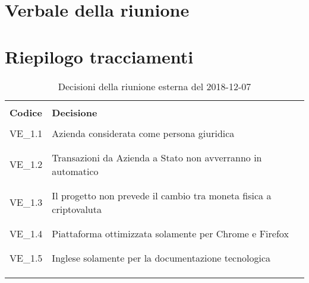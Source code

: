 \section{Verbale della riunione}

\begin{itemize}


\end{itemize}

\section{Riepilogo tracciamenti}
\begin{centering}
\begin{longtable}{ >{\centering}p{4cm} >{\centering}p{11cm} }

\hline
\\[0.5pt]
	\textbf{Codice} & \textbf{Decisione} 
	
	\tabularnewline 
	\hline
	
	
				\\[0.5pt]
				VE\_1.1 & Azienda considerata come persona giuridica
				\\[0.5pt]
				\tabularnewline
				\hline
						
				\\[0.5pt]
				VE\_1.2 & Transazioni da Azienda a Stato non avverranno in automatico
				\\[0.5pt]
				\tabularnewline
				\hline
				
				\\[0.5pt]
				VE\_1.3 & Il progetto non prevede il cambio tra moneta fisica a criptovaluta
				\\[0.5pt]
				\tabularnewline
				\hline
								
				\\[0.5pt]
				VE\_1.4 & Piattaforma ottimizzata solamente per Chrome e Firefox
				\\[0.5pt]
				\tabularnewline
				\hline
				
				\\[0.5pt]
				VE\_1.5 & Inglese solamente per la documentazione tecnologica
				\\[0.5pt]
				\tabularnewline
				\hline
				
                
        \\[0.7pt]
        \caption{Decisioni della riunione esterna del 2018-12-07}
\end{longtable}
\end{centering}

